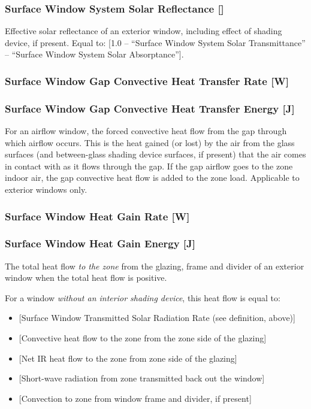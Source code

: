 \subsubsection{Surface Window System Solar Reflectance {[]}}\label{surface-window-system-solar-reflectance}

Effective solar reflectance of an exterior window, including effect of shading device, if present. Equal to: {[}1.0 -- ``Surface Window System Solar Transmittance'' -- ``Surface Window System Solar Absorptance''{]}.

\subsubsection{Surface Window Gap Convective Heat Transfer Rate {[}W{]}}\label{surface-window-gap-convective-heat-transfer-rate-w}

\subsubsection{Surface Window Gap Convective Heat Transfer Energy {[}J{]}}\label{surface-window-gap-convective-heat-transfer-energy-j}

For an airflow window, the forced convective heat flow from the gap through which airflow occurs. This is the heat gained (or lost) by the air from the glass surfaces (and between-glass shading device surfaces, if present) that the air comes in contact with as it flows through the gap. If the gap airflow goes to the zone indoor air, the gap convective heat flow is added to the zone load. Applicable to exterior windows only.

\subsubsection{Surface Window Heat Gain Rate {[}W{]}}\label{surface-window-heat-gain-rate-w}

\subsubsection{Surface Window Heat Gain Energy {[}J{]}}\label{surface-window-heat-gain-energy-j}

The total heat flow \emph{to the zone} from the glazing, frame and divider of an exterior window when the total heat flow is positive.

For a window \emph{without an interior shading device}, this heat flow is equal to:

\begin{itemize}
\item
  {[}Surface Window Transmitted Solar Radiation Rate (see definition, above){]}
\item
  {[}Convective heat flow to the zone from the zone side of the glazing{]}
\item
  {[}Net IR heat flow to the zone from zone side of the glazing{]}
\item
  {[}Short-wave radiation from zone transmitted back out the window{]}
\item
  {[}Convection to zone from window frame and divider, if present{]}
\end{itemize}

